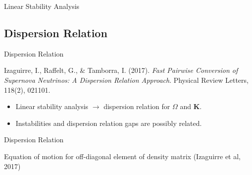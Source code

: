 \documentclass[9pt]{beamer}
\begin{document}
\begin{darkframes}
\begin{frame}{Linear Stability Analysis}
\begin{tcolorbox}
 \end{tcolorbox}
\end{frame}






\subsection{Dispersion Relation}


\begin{frame}{ Dispersion Relation }

    \begin{tcolorbox}[standard jigsaw,opacityback=0]
        \color{white}
        Izaguirre, I., Raffelt, G., \& Tamborra, I. (2017). \emph{Fast Pairwise Conversion of Supernova Neutrinos: A Dispersion Relation Approach}. Physical Review Letters, 118(2), 021101.
    \end{tcolorbox}


    \begin{itemize}[<+->]
        \item Linear stability analysis $\rightarrow$ dispersion relation for $\Omega$ and $\mathbf K$.
        \item Instabilities and dispersion relation gaps are possibly related.
    \end{itemize}

    \end{frame}


\begin{frame}{Dispersion Relation}

Equation of motion for off-diagonal element of density matrix (Izaguirre et al, 2017)




\end{frame}
\end{darkframes}
\end{document}
